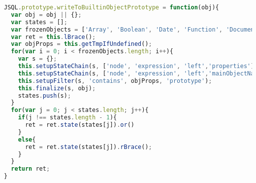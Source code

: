 \documentclass[a4paper, 12pt]{report}
\theoremstyle{definition}
\begin{document}
\begin{appendices}
\begin{lstlisting}[label={lst:WriteToBuiltinObjectPrototype},language=JavaScript,caption=The \texttt{writeToBuiltinObjectPrototype} policy,mathescape=true]
JSQL.prototype.writeToBuiltinObjectPrototype = function(obj){
  var obj = obj || {};
  var states = [];
  var frozenObjects = ['Array', 'Boolean', 'Date', 'Function', 'Document', 'Math', 'Window','String'];
  var ret = this.lBrace();
  var objProps = this.getTmpIfUndefined();
  for(var i = 0; i < frozenObjects.length; i++){
    var s = {};
    this.setupStateChain(s, ['node', 'expression', 'left','properties'], objProps);
    this.setupStateChain(s, ['node', 'expression', 'left','mainObjectName'], frozenObjects[i]);
    this.setupFilter(s, 'contains', objProps, 'prototype');
    this.finalize(s, obj);
    states.push(s);
  }
  for(var j = 0; j < states.length; j++){
    if(j !== states.length - 1){
      ret = ret.state(states[j]).or()
    }
    else{
      ret = ret.state(states[j]).rBrace();
    }
  }
  return ret;
}
\end{lstlisting}



\end{appendices}

\printbibliography
\end{document}
